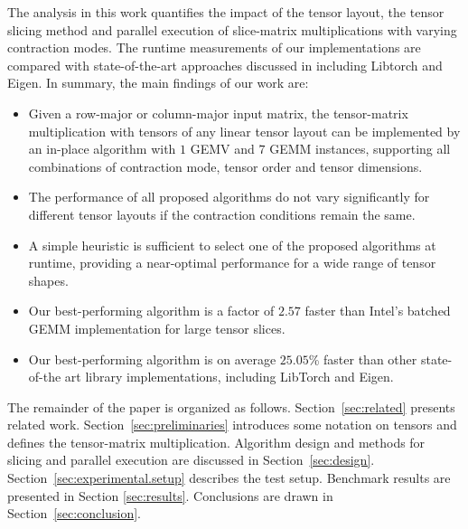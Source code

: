 The analysis in this work quantifies the impact of the tensor layout, the tensor slicing method and parallel execution of slice-matrix multiplications with varying contraction modes.
The runtime measurements of our implementations are compared with state-of-the-art approaches discussed in \citep{springer:2018:design, matthews:2018:high, paszke:2019:pytorch} including Libtorch and Eigen. In summary, the main findings of our work are:
\begin{itemize}
	\item 
	Given a row-major or column-major input matrix, the tensor-matrix multiplication with tensors of any linear tensor layout can be implemented by an in-place algorithm with $1$ GEMV and $7$ GEMM instances, supporting all combinations of contraction mode, tensor order and tensor dimensions.
	\item 
	The performance of all proposed algorithms do not vary significantly for different tensor layouts if the contraction conditions remain the same.
	\item 
	A simple heuristic is sufficient to select one of the proposed algorithms at runtime, providing a near-optimal performance for a wide range of tensor shapes.	
	\item 
	Our best-performing algorithm is a factor of $2.57$ faster than Intel's batched GEMM implementation for large tensor slices.
	\item
	Our best-performing algorithm is on average $25.05$\% faster than other state-of-the art library implementations, including LibTorch and Eigen.
\end{itemize}

The remainder of the paper is organized as follows. 
Section~\ref{sec:related} presents related work.
Section~\ref{sec:preliminaries} introduces some notation on tensors and defines the tensor-matrix multiplication.
Algorithm design and methods for slicing and parallel execution are discussed in Section~\ref{sec:design}.
Section~\ref{sec:experimental.setup} describes the test setup. 
Benchmark results are presented in Section \ref{sec:results}.
Conclusions are drawn in Section~\ref{sec:conclusion}.
